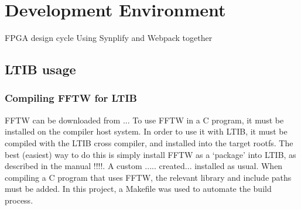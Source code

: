 \chapter{Development Environment} %
\label{apdx:development_environment}


FPGA design cycle
Using Synplify and Webpack together


\section{LTIB usage} %
\label{apdx:ltib_usage}

	\subsection{Compiling FFTW for LTIB} %
	\label{apdx:compiling_fftw_for_ltib}
		FFTW can be downloaded from ...
		To use FFTW in a C program, it must be installed on the compiler host system.  In order to use it with LTIB, it must be compiled with the LTIB cross compiler, and installed into the target rootfs.  The best (easiest) way to do this is simply install FFTW as a `package' into LTIB, as described in the manual !!!!.  A custom ..... created... installed as usual.
		When compiling a C program that uses FFTW, the relevant library and include paths must be added.  In this project, a Makefile was used to automate the build process.


